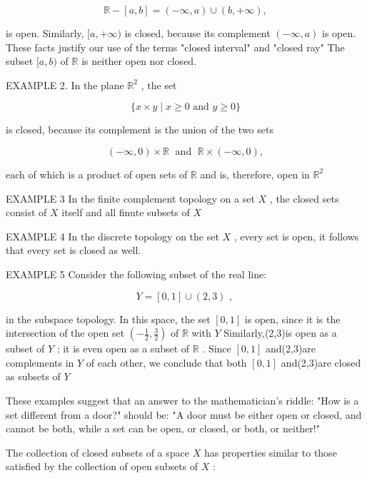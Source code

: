 \[
\mathbb{R} - \left\lbrack  {a,b}\right\rbrack   = \left( {-\infty ,a}\right)  \cup  \left( {b, + \infty }\right) ,
\]

is open. Similarly, \(\lbrack a, + \infty )\) is closed, because its complement \(\left( {-\infty ,a}\right)\) is open. These facts justify our use of the terms "closed interval" and "closed ray" The subset \(\lbrack a,b)\) of \(\mathbb{R}\) is neither open nor closed.

EXAMPLE 2. In the plane \({\mathbb{R}}^{2}\) , the set

\[
\{ x \times  y \mid  x \geq  0\text{ and }y \geq  0\}
\]

is closed, because its complement is the union of the two sets

\[
\left( {-\infty ,0}\right)  \times  \mathbb{R}\;\text{ and }\;\mathbb{R} \times  \left( {-\infty ,0}\right) ,
\]

each of which is a product of open sets of \(\mathbb{R}\) and is, therefore, open in \({\mathbb{R}}^{2}\)

EXAMPLE 3 In the finite complement topology on a set \(X\) , the closed sets consist of \(X\) itself and all finute subsets of \(X\)

EXAMPLE 4 In the discrete topology on the set \(X\) , every set is open, it follows that every set is closed as well.

EXAMPLE 5 Consider the following subset of the real line:

\[
Y = \left\lbrack  {0,1}\right\rbrack   \cup  \left( {2,3}\right) \text{ , }
\]

in the subspace topology. In this space, the set \(\left\lbrack  {0,1}\right\rbrack\) is open, since it is the intersection of the open set \(\left( {-\frac{1}{2},\frac{3}{2}}\right)\) of \(\mathbb{R}\) with \(Y\) Similarly,(2,3)is open as a subset of \(Y\) ; it is even open as a subset of \(\mathbb{R}\) . Since \(\left\lbrack  {0,1}\right\rbrack\) and(2,3)are complements in \(Y\) of each other, we conclude that both \(\left\lbrack  {0,1}\right\rbrack\) and(2,3)are closed as subsets of \(Y\)

These examples suggest that an answer to the mathematician's riddle: "How is a set different from a door?" should be: "A door must be either open or closed, and cannot be both, while a set can be open, or closed, or both, or neither!"

The collection of closed subsets of a space \(X\) has properties similar to those satisfied by the collection of open subsets of \(X\) :

